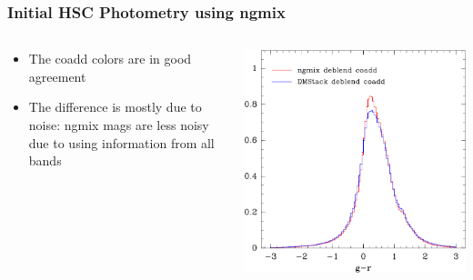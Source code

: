 \documentclass{beamer}
\begin{document}
\frame
{
    \frametitle{Initial HSC Photometry using ngmix}

 
    \begin{columns}
        \begin{column}{0.5\textwidth}
            \begin{itemize}

                \item The coadd colors are in good agreement 
                \item The difference is mostly due to noise: ngmix mags
                    are less noisy due to using information from
                    all bands

            \end{itemize}
        \end{column}
        \begin{column}{0.5\textwidth}
            \includegraphics[width=\textwidth]{compare-dbcoadd-dmstack-gmr.png}
        \end{column}
    \end{columns}
}
\end{document}
